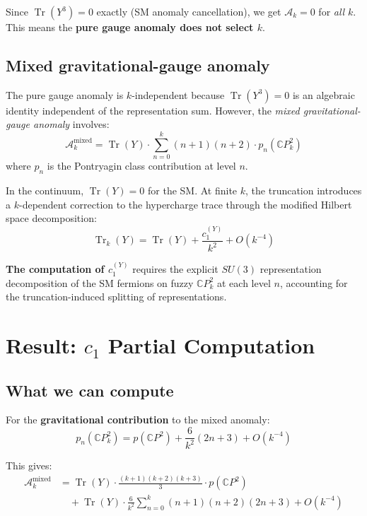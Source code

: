 \documentclass[11pt,a4paper]{article}
\newcommand{\Tr}{\operatorname{Tr}}
\newcommand{\CP}{\mathbb{C}P}
\begin{document}
Since $\Tr(Y^3) = 0$ exactly (SM anomaly cancellation), we get $\mathcal{A}_k = 0$ for \emph{all} $k$. This means the \textbf{pure gauge anomaly does not select $k$}.

\subsection{Mixed gravitational-gauge anomaly}

The pure gauge anomaly is $k$-independent because $\Tr(Y^3) = 0$ is an algebraic identity independent of the representation sum. However, the \emph{mixed gravitational-gauge anomaly} involves:
\begin{equation}
\mathcal{A}_k^{\text{mixed}} = \Tr(Y) \cdot \sum_{n=0}^{k} (n+1)(n+2) \cdot p_n(\CP^2_k)
\end{equation}
where $p_n$ is the Pontryagin class contribution at level $n$.

In the continuum, $\Tr(Y) = 0$ for the SM. At finite $k$, the truncation introduces a $k$-dependent correction to the hypercharge trace through the modified Hilbert space decomposition:
\begin{equation}
\Tr_k(Y) = \Tr(Y) + \frac{c_1^{(Y)}}{k^2} + O(k^{-4})
\end{equation}

\textbf{The computation of $c_1^{(Y)}$} requires the explicit $SU(3)$ representation decomposition of the SM fermions on fuzzy $\CP^2_k$ at each level $n$, accounting for the truncation-induced splitting of representations.

\section{Result: $c_1$ Partial Computation}

\subsection{What we can compute}

For the \textbf{gravitational contribution} to the mixed anomaly:
\begin{equation}
p_n(\CP^2_k) = p(\CP^2) + \frac{6}{k^2}(2n+3) + O(k^{-4})
\end{equation}

This gives:
\begin{align}
\mathcal{A}_k^{\text{mixed}} &= \Tr(Y) \cdot \frac{(k+1)(k+2)(k+3)}{3} \cdot p(\CP^2) \nonumber \\
&\quad + \Tr(Y) \cdot \frac{6}{k^2} \sum_{n=0}^{k} (n+1)(n+2)(2n+3) + O(k^{-4})
\end{align}
\end{document}
